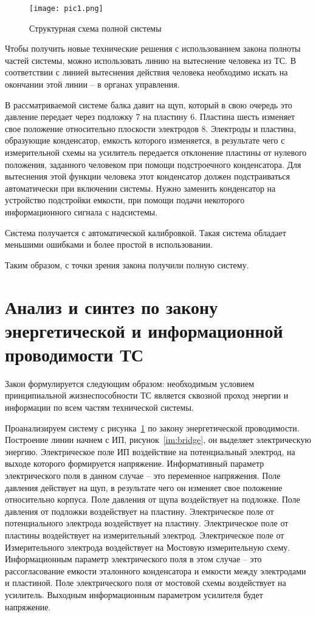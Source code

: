 \begin{figure}[h!]
	\centering
	\texttt{[image: pic1.png]}
	\caption{Структурная схема полной системы}
	\label{pic1}
\end{figure}

Чтобы получить новые технические решения с использованием закона полноты частей системы, можно использовать линию на вытеснение человека из ТС. В соответствии с
линией вытеснения действия человека необходимо искать на окончании этой линии -- в органах управления.

В рассматриваемой системе балка давит на щуп, который в свою очередь это давление передает через подложку 7 на пластину 6. Пластина шесть изменяет свое положение относительно плоскости электродов 8. Электроды и пластина, образующие конденсатор, емкость которого изменяется, в результате чего с измерительной схемы на усилитель передается отклонение пластины от нулевого положения, заданного человеком при помощи подстроечного конденсатора. Для вытеснения этой функции человека этот конденсатор должен подстраиваться автоматически при включении системы. Нужно заменить конденсатор на устройство подстройки емкости, при помощи подачи некоторого информационного сигнала 
с надсистемы.

Система получается с автоматической калибровкой. Такая система обладает меньшими ошибками и более простой в использовании. 

Таким образом, с точки зрения закона получили полную систему.


\section{Анализ и синтез по закону энергетической и информационной проводимости ТС}

Закон формулируется следующим образом: необходимым условием
принципиальной жизнеспособности ТС является сквозной проход энергии
и информации по всем частям технической системы.

Проанализируем систему с рисунка~\ref{pic1} по закону энергетической проводимости. Построение линии начнем с ИП, рисунок~\ref{im:bridge}, он выделяет электрическую энергию. Электрическое поле ИП воздействие на потенциальный электрод, на выходе которого формируется напряжение. Информативный параметр электрического поля в данном случае -- это переменное напряжения. 
Поле давления действует на щуп, в результате чего он изменяет свое положение относительно корпуса. 
Поле давления от щупа воздействует на подложке. Поле давления от подложки воздействует на пластину. Электрическое поле от потенциального электрода воздействует на пластину. Электрическое поле от пластины воздействует на измерительный электрод. Электрическое поле от Измерительного электрода воздействует на Мостовую измерительную схему. Информационным параметр электрического поля в этом случае -- это рассогласование емкости эталонного конденсатора и емкости между электродами и пластиной. Поле электрического поля от мостовой схемы воздействует на усилитель. Выходным информационным параметром усилителя будет напряжение.


